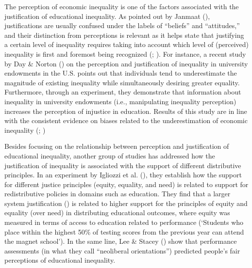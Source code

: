 \documentclass[
  12pt,
  a4paper,
]{article}
\begin{document}
The perception of economic inequality is one of the factors associated with the justification of educational inequality. As pointed out by Janmaat (), justifications are usually confused under the labels of ``beliefs'' and ``attitudes,'' and their distinction from perceptions is relevant as it helps state that justifying a certain level of inequality requires taking into account which level of (perceived) inequality is first and foremost being recognized (; ). For instance, a recent study by Day \& Norton () on the perception and justification of inequality in university endowments in the U.S. points out that individuals tend to underestimate the magnitude of existing inequality while simultaneously desiring greater equality. Furthermore, through an experiment, they demonstrate that information about inequality in university endowments (i.e., manipulating inequality perception) increases the perception of injustice in education. Results of this study are in line with the consistent evidence on biases related to the underestimation of economic inequality (; )

Besides focusing on the relationship between perception and justification of educational inequality, another group of studies has addressed how the justification of inequality is associated with the support of different distributive principles. In an experiment by Igliozzi et al. (), they establish how the support for different justice principles (equity, equality, and need) is related to support for redistributive policies in domains such as education. They find that a larger system justification () is related to higher support for the principles of equity and equality (over need) in distributing educational outcomes, where equity was measured in terms of access to education related to performance (`Students who place within the highest 50\% of testing scores from the previous year can attend the magnet school'). In the same line, Lee \& Stacey () show that performance assessments (in what they call ``neoliberal orientations'') predicted people's fair perceptions of educational inequality.
\end{document}
